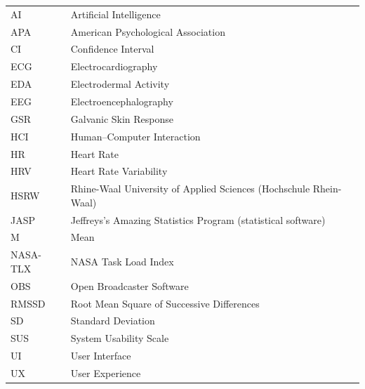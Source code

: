 \begin{longtable}[]{@{}p{}p{}@{}}
AI & Artificial Intelligence \\
APA & American Psychological Association \\
CI & Confidence Interval \\
ECG & Electrocardiography \\
EDA & Electrodermal Activity \\
EEG & Electroencephalography \\
GSR & Galvanic Skin Response \\
HCI & Human--Computer Interaction \\
HR & Heart Rate \\
HRV & Heart Rate Variability \\
HSRW & Rhine-Waal University of Applied Sciences (Hochschule Rhein-Waal) \\
JASP & Jeffreys's Amazing Statistics Program (statistical software) \\
M & Mean \\
NASA-TLX & NASA Task Load Index \\
OBS & Open Broadcaster Software \\
RMSSD & Root Mean Square of Successive Differences \\
SD & Standard Deviation \\
SUS & System Usability Scale \\
UI & User Interface \\
UX & User Experience \\
\end{longtable}
